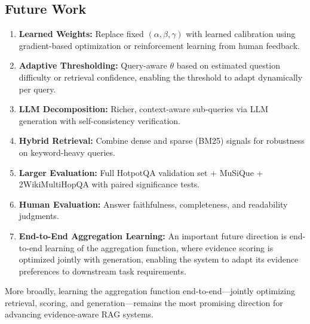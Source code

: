 \documentclass[conference]{IEEEtran}
\begin{document}
\subsection{Future Work}
\begin{enumerate}[leftmargin=*]
\item \textbf{Learned Weights:} Replace fixed $(\alpha, \beta, \gamma)$ with learned calibration using gradient-based optimization or reinforcement learning from human feedback.
\item \textbf{Adaptive Thresholding:} Query-aware $\theta$ based on estimated question difficulty or retrieval confidence, enabling the threshold to adapt dynamically per query.
\item \textbf{LLM Decomposition:} Richer, context-aware sub-queries via LLM generation with self-consistency verification.
\item \textbf{Hybrid Retrieval:} Combine dense and sparse (BM25) signals for robustness on keyword-heavy queries.
\item \textbf{Larger Evaluation:} Full HotpotQA validation set + MuSiQue + 2WikiMultiHopQA with paired significance tests.
\item \textbf{Human Evaluation:} Answer faithfulness, completeness, and readability judgments.
\item \textbf{End-to-End Aggregation Learning:} An important future direction is end-to-end learning of the aggregation function, where evidence scoring is optimized jointly with generation, enabling the system to adapt its evidence preferences to downstream task requirements.
\end{enumerate}

More broadly, learning the aggregation function end-to-end---jointly optimizing retrieval, scoring, and generation---remains the most promising direction for advancing evidence-aware RAG systems.

\end{document}
